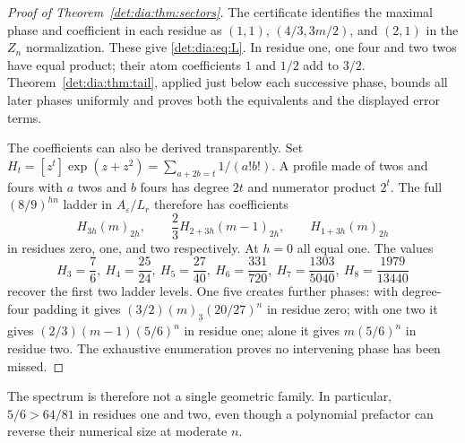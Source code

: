 \documentclass[11pt,letterpaper]{article}
\numberwithin{equation}{section}
\theoremstyle{definition}\newtheorem{definition}[theorem]{Definition}
\theoremstyle{remark}\newtheorem{remark}[theorem]{Remark}
\newcommand{\fall}[2]{(#1)_{\underline{#2}}}
\newcommand{\eps}{\varepsilon}
\newcommand{\coef}[2]{[#1^{#2}]}
\begin{document}
\begin{proof}[Proof of Theorem~\ref{det:dia:thm:sectors}]
The certificate identifies the maximal phase and coefficient in each
residue as $(1,1)$, $(4/3,3m/2)$, and $(2,1)$ in the $Z_n$
normalization. These give \eqref{det:dia:eq:L}. In residue one, one four and two
twos have equal product; their atom coefficients $1$ and $1/2$ add to
$3/2$. Theorem~\ref{det:dia:thm:tail}, applied just below each successive phase,
bounds all later phases uniformly and proves both the equivalents and
the displayed error terms.

The coefficients can also be derived transparently. Set
$H_t=\coef{z}{t}\exp(z+z^2)=\sum_{a+2b=t}1/(a!b!)$.
A profile made of twos and fours with $a$ twos and $b$ fours has degree
$2t$ and numerator product $2^t$. The full $(8/9)^{hn}$ ladder in
$A_\eps/L_r$ therefore has coefficients
\begin{equation}\label{det:dia:eq:ladder}
 H_{3h}\fall{m}{2h},\qquad
 \frac23 H_{2+3h}\fall{m-1}{2h},\qquad
 H_{1+3h}\fall{m}{2h}
\end{equation}
in residues zero, one, and two respectively. At $h=0$ all equal one.
The values
\[
 H_3=\frac76,\ H_4=\frac{25}{24},\ H_5=\frac{27}{40},\
 H_6=\frac{331}{720},\ H_7=\frac{1303}{5040},\
 H_8=\frac{1979}{13440}
\]
recover the first two ladder levels. One five creates further phases:
with degree-four padding it gives $(3/2)\fall{m}{3}(20/27)^n$ in
residue zero; with one two it gives $(2/3)(m-1)(5/6)^n$ in residue one;
alone it gives $m(5/6)^n$ in residue two. The exhaustive enumeration
proves no intervening phase has been missed.
\end{proof}
The spectrum is therefore not a single geometric family. In particular,
$5/6>64/81$ in residues one and two, even though a polynomial prefactor
can reverse their numerical size at moderate $n$.
\end{document}
